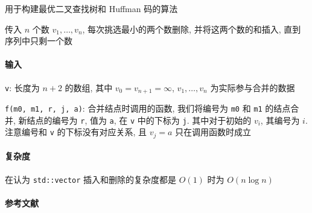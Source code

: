 用于构建最优二叉查找树和 Huffman 码的算法

传入 \(n\) 个数 \(v_1,\dots,v_n\), 每次挑选最小的两个数删除, 并将这两个数的和插入, 直到序列中只剩一个数

\paragraph{输入}

\verb|v|: 长度为 \(n+2\) 的数组, 其中 \(v_0=v_{n+1}=\infty\), \(v_1,\dots,v_n\) 为实际参与合并的数据

\verb|f(m0, m1, r, j, a)|: 合并结点时调用的函数, 我们将编号为 \verb|m0| 和 \verb|m1| 的结点合并, 新结点的编号为 \verb|r|, 值为 \verb|a|, 在 \verb|v| 中的下标为 \verb|j|. 其中对于初始的 \(v_i\), 其编号为 \(i\). 注意编号和 \verb|v| 的下标没有对应关系, 且 \(v_j=a\) 只在调用函数时成立

\paragraph{复杂度} 在认为 \verb|std::vector| 插入和删除的复杂度都是 \(O(1)\) 时为 \(O(n\log n)\)

\paragraph{参考文献} \cite{garsia1977new} \cite{kingston1988new}